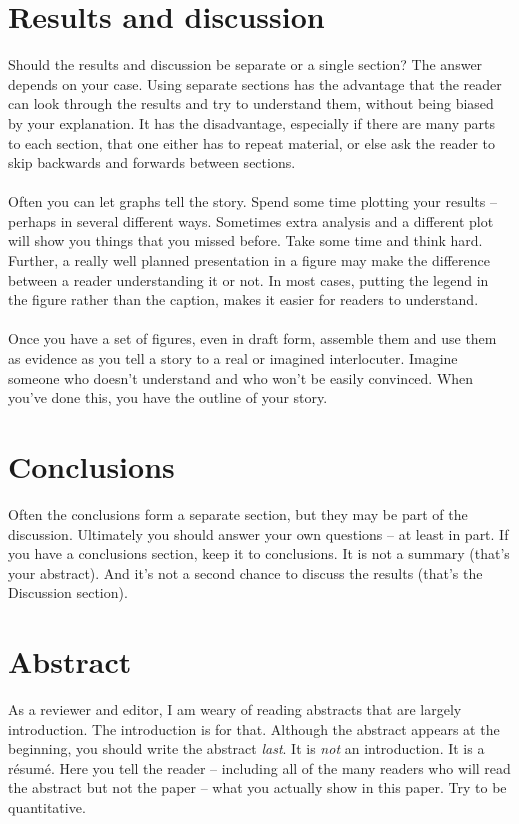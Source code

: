 \documentclass[a4paper,12pt]{article}
\begin{document}
\section{Results and discussion}
Should the results and discussion be separate or a single section? The answer depends on your case. Using separate sections has the advantage that the reader can look through the results and try to understand them, without being biased by your explanation. It has the disadvantage, especially if there are many parts to each section, that one either has to repeat material, or else ask the reader to skip backwards and forwards between sections.\\\\Often you can let graphs tell the story. Spend some time plotting your results – perhaps in several different ways. Sometimes extra analysis and a different plot will show you things that you missed before. Take some time and think hard. Further, a really well planned presentation in a figure may make the difference between a reader understanding it or not. In most cases, putting the legend in the figure rather than the caption, makes it easier for readers to understand.\\\\Once you have a set of figures, even in draft form, assemble them and use them as evidence as you tell a story to a real or imagined interlocuter. Imagine someone who doesn’t understand and who won’t be easily convinced. When you’ve done this, you have the outline of your story.
\section{Conclusions}
Often the conclusions form a separate section, but they may be part of the discussion. Ultimately  you should answer your own questions – at least in part. If you have a conclusions section, keep it to conclusions. It is not a summary (that's your abstract). And it's not a second chance to discuss the results (that's the Discussion section).
\section{Abstract}
As a reviewer and editor, I am weary of reading abstracts that are largely introduction. The introduction is for that. Although the abstract appears at the beginning, you should write the abstract \textit{last}. It is \textit{not} an introduction. It is a résumé. Here you tell the reader – including all of the many readers who will read the abstract but not the paper – what you actually show in this paper. Try to be quantitative.
\end{document}
